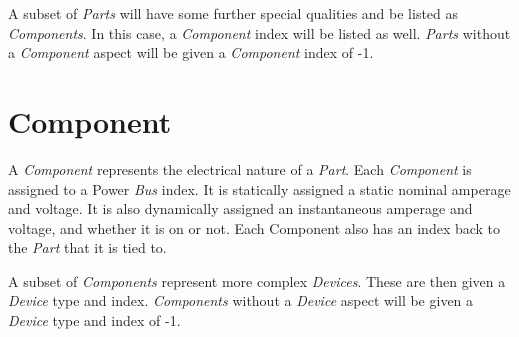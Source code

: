 \documentclass[10pt,letterpaper]{report}
\begin{document}
A subset of \textit{Parts} will have some further special qualities and be listed as \textit{Components}. In this case, a \textit{Component} index will be listed as well. \textit{Parts} without a \textit{Component} aspect will be given a \textit{Component} index of -1.
\section{Component}
A \textit{Component} represents the electrical nature of a \textit{Part}. Each \textit{Component} is assigned to a Power \textit{Bus} index. It is statically assigned a static nominal amperage and voltage. It is also dynamically assigned an instantaneous amperage and voltage, and whether it is on or not. Each Component also has an index back to the \textit{Part} that it is tied to.

A subset of \textit{Components} represent more complex \textit{Devices}. These are then given a \textit{Device} type and index. \textit{Components} without a \textit{Device} aspect will be given a \textit{Device} type and index of -1.
\end{document}
